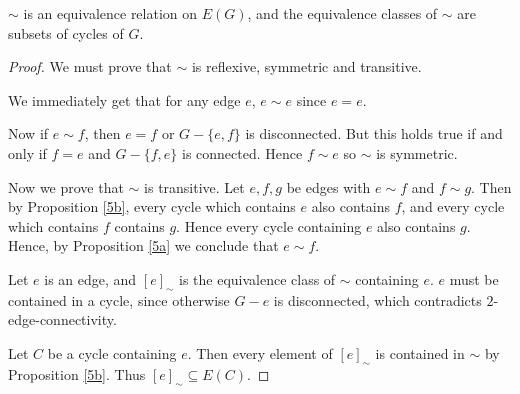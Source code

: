 \documentclass{unswmaths}
\begin{document}
\begin{proposition}[Part (c)]
\label{5c}
    $\sim$ is an equivalence relation on $E(G)$, and the equivalence classes
    of $\sim$ are subsets of cycles of $G$.
\end{proposition}
\begin{proof}
    We must prove that $\sim$ is reflexive, symmetric and transitive.
    
    We immediately get that for any edge $e$, $e \sim e$ since $e = e$.
    
    Now if $e \sim f$, then $e = f$ or $G - \{e,f\}$ is disconnected. 
    But this holds true if and only if $f = e$ and $G - \{f,e\}$ is connected.
    Hence $f \sim e$ so $\sim$ is symmetric.
    
    Now we prove that $\sim$ is transitive. Let $e,f,g$ be edges with $e \sim f$
    and $f \sim g$. Then by Proposition \ref{5b}, every cycle which contains $e$
    also contains $f$, and every cycle which contains $f$ contains $g$.
    Hence every cycle containing $e$ also contains $g$. Hence, by Proposition \ref{5a}
    we conclude that $e \sim f$.    
    
    Let $e$ is an edge, and $[e]_\sim$ is the equivalence class
    of $\sim$ containing $e$. 
    $e$ must be contained in a cycle, since otherwise $G-e$ is disconnected, which
    contradicts $2$-edge-connectivity.
    
    Let $C$ be a cycle containing $e$. Then every 
    element of $[e]_\sim$ is contained in $\sim$ by Proposition \ref{5b}. 
    Thus $[e]_\sim \subseteq E(C)$.
\end{proof}
\end{document}
